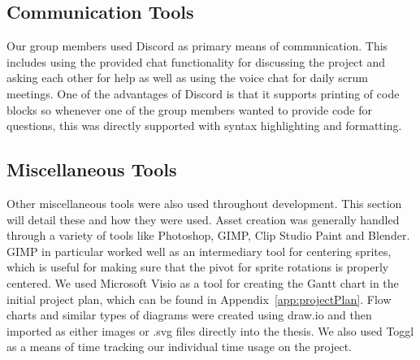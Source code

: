 \subsection{Communication Tools}
Our group members used Discord as primary means of communication. This includes using the provided chat functionality for discussing the project and asking each other for help as well as using the voice chat for daily scrum meetings. One of the advantages of Discord is that it supports printing of code blocks so whenever one of the group members wanted to provide code for questions, this was directly supported with syntax highlighting and formatting.   

\subsection{Miscellaneous Tools}
Other miscellaneous tools were also used throughout development. This section will detail these and how they were used. 
Asset creation was generally handled through a variety of tools like Photoshop, GIMP, Clip Studio Paint and Blender. GIMP in particular worked well as an intermediary tool for centering sprites, which is useful for making sure that the pivot for sprite rotations is properly centered. 
We used Microsoft Visio as a tool for creating the Gantt chart in the initial project plan, which can be found in Appendix~\ref{app:projectPlan}. Flow charts and similar types of diagrams were created using draw.io and then imported as either images or .svg files directly into the thesis.
We also used Toggl as a means of time tracking our individual time usage on the project. 